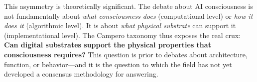This asymmetry is theoretically significant. The debate about AI consciousness is not
fundamentally about \emph{what consciousness does} (computational level) or \emph{how it
does it} (algorithmic level). It is about \emph{what physical substrate} can support it
(implementational level). The Campero taxonomy thus exposes the real crux: \textbf{Can
digital substrates support the physical properties that consciousness requires?} This
question is prior to debates about architecture, function, or behavior---and it is the
question to which the field has not yet developed a consensus methodology for answering.
